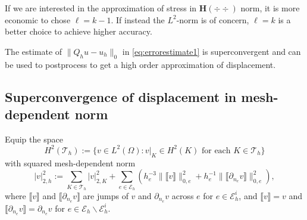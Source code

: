If we are interested in the approximation of stress in $\boldsymbol  H(\div\div)$ norm, it is more economic to chose $\ell = k - 1$.
If instead the $L^2$-norm is of concern, $\ell = k$ is a better choice to achieve higher accuracy.

The estimate of $\|Q_hu-u_h\|_0$ in \eqref{eq:errorestimate1} is superconvergent and can be used to postprocess to get a high order approximation of displacement.

\subsection{Superconvergence of displacement in mesh-dependent norm}

Equip the space $$H^2(\mathcal T_h):=\{v\in L^2(\Omega): v|_K\in H^2(K) \textrm{ for each } K\in\mathcal T_h\}$$ with squared mesh-dependent norm
\[
|v|_{2,h}^2:=\sum_{K\in\mathcal{T}_h}|v|_{2,K}^2+\sum_{e\in\mathcal E_h}\left(h_e^{-3}\|\llbracket v\rrbracket\|_{0,e}^2+h_e^{-1}\|\llbracket \partial_{n_e}v\rrbracket\|_{0,e}^2\right),
\]
where $\llbracket v\rrbracket$ and $\llbracket \partial_{n_e}v\rrbracket$ are jumps of $v$ and $\partial_{n_e}v$ across $e$ for $e\in \mathcal E_h^i$, and $\llbracket v\rrbracket=v$ and $\llbracket \partial_{n_e}v\rrbracket=\partial_{n_e}v$ for $e\in \mathcal E_h\backslash\mathcal E_h^i$.

